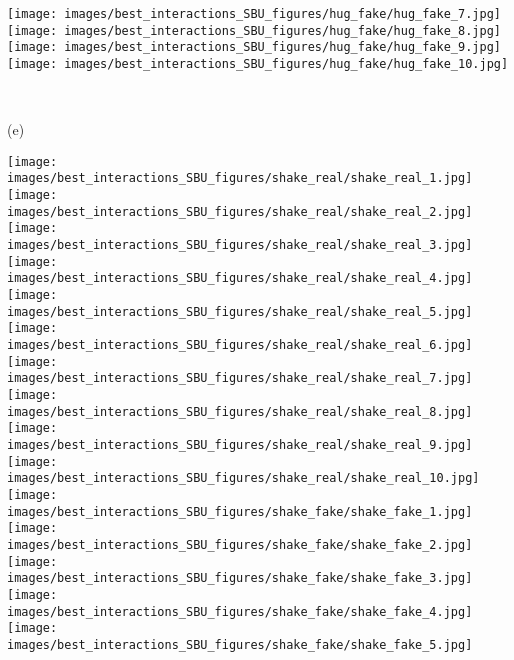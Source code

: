 \documentclass[times,twocolumn,final]{elsarticle}
\begin{document}
\begin{figure*}
\begin{minipage}{0.9\textwidth}
  \hfill
  \texttt{[image: images/best\_interactions\_SBU\_figures/hug\_fake/hug\_fake\_7.jpg]}
  \hfill
  \texttt{[image: images/best\_interactions\_SBU\_figures/hug\_fake/hug\_fake\_8.jpg]}
  \hfill
  \texttt{[image: images/best\_interactions\_SBU\_figures/hug\_fake/hug\_fake\_9.jpg]}
  \hfill
  \texttt{[image: images/best\_interactions\_SBU\_figures/hug\_fake/hug\_fake\_10.jpg]}
  \hfill
    \end{minipage}\\
    \begin{minipage}{0.08\textwidth}
       (e)\quad{}%
    \end{minipage}
    \begin{minipage}{0.9\textwidth}
  \texttt{[image: images/best\_interactions\_SBU\_figures/shake\_real/shake\_real\_1.jpg]}
  \hfill
  \texttt{[image: images/best\_interactions\_SBU\_figures/shake\_real/shake\_real\_2.jpg]}
  \hfill
  \texttt{[image: images/best\_interactions\_SBU\_figures/shake\_real/shake\_real\_3.jpg]}
  \hfill
  \texttt{[image: images/best\_interactions\_SBU\_figures/shake\_real/shake\_real\_4.jpg]}
  \hfill
  \texttt{[image: images/best\_interactions\_SBU\_figures/shake\_real/shake\_real\_5.jpg]}
  \hfill
  \texttt{[image: images/best\_interactions\_SBU\_figures/shake\_real/shake\_real\_6.jpg]}
  \hfill
  \texttt{[image: images/best\_interactions\_SBU\_figures/shake\_real/shake\_real\_7.jpg]}
  \hfill
  \texttt{[image: images/best\_interactions\_SBU\_figures/shake\_real/shake\_real\_8.jpg]}
  \hfill
  \texttt{[image: images/best\_interactions\_SBU\_figures/shake\_real/shake\_real\_9.jpg]}
  \hfill
  \texttt{[image: images/best\_interactions\_SBU\_figures/shake\_real/shake\_real\_10.jpg]}
  \hfill \\
  \texttt{[image: images/best\_interactions\_SBU\_figures/shake\_fake/shake\_fake\_1.jpg]}
  \hfill 
  \texttt{[image: images/best\_interactions\_SBU\_figures/shake\_fake/shake\_fake\_2.jpg]}
  \hfill 
  \texttt{[image: images/best\_interactions\_SBU\_figures/shake\_fake/shake\_fake\_3.jpg]}
  \hfill 
  \texttt{[image: images/best\_interactions\_SBU\_figures/shake\_fake/shake\_fake\_4.jpg]}
  \hfill 
  \texttt{[image: images/best\_interactions\_SBU\_figures/shake\_fake/shake\_fake\_5.jpg]}

\end{minipage}
\end{figure*}
\end{document}
